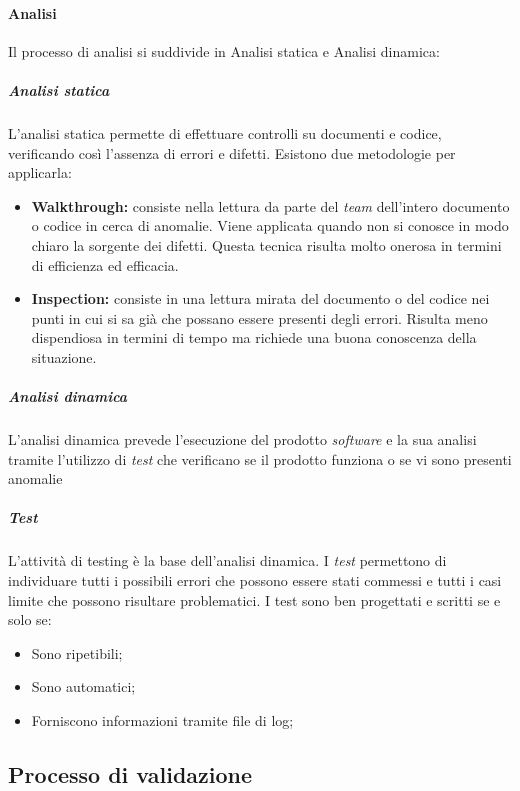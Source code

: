 				\paragraph{Analisi}
					Il processo di analisi si suddivide in Analisi statica e Analisi dinamica:
						\subparagraph{Analisi statica}
							L'analisi statica permette di effettuare controlli su documenti e codice, verificando così l'assenza di errori e difetti. Esistono due metodologie per applicarla:
								\begin{itemize}
									\item \textbf{Walkthrough:} consiste nella lettura da parte del \emph{team} dell'intero documento o codice in cerca di anomalie. Viene applicata quando non si conosce in modo chiaro la sorgente dei difetti. Questa tecnica risulta molto onerosa in termini di efficienza ed efficacia.
									\item \textbf{Inspection:} consiste in una lettura mirata del documento o del codice nei punti in cui si sa già che possano essere presenti degli errori. Risulta meno dispendiosa in termini di tempo ma richiede una buona conoscenza della situazione.
								\end{itemize}
						\subparagraph{Analisi dinamica}
							L'analisi dinamica prevede l'esecuzione del prodotto \emph{software} e la sua analisi tramite l'utilizzo di \emph{test} che verificano se il prodotto funziona o se vi sono presenti anomalie
						\subparagraph{Test}
							L'attività di testing è la base dell'analisi dinamica. I \emph{test} permettono di individuare tutti i possibili errori che possono essere stati commessi e tutti i casi limite che possono risultare problematici. \newline
							I test sono ben progettati e scritti se e solo se:
								\begin{itemize}
									\item Sono ripetibili;
									\item Sono automatici;
									\item Forniscono informazioni tramite file di log;
								\end{itemize}
							
		
		\subsection{Processo di validazione} %
